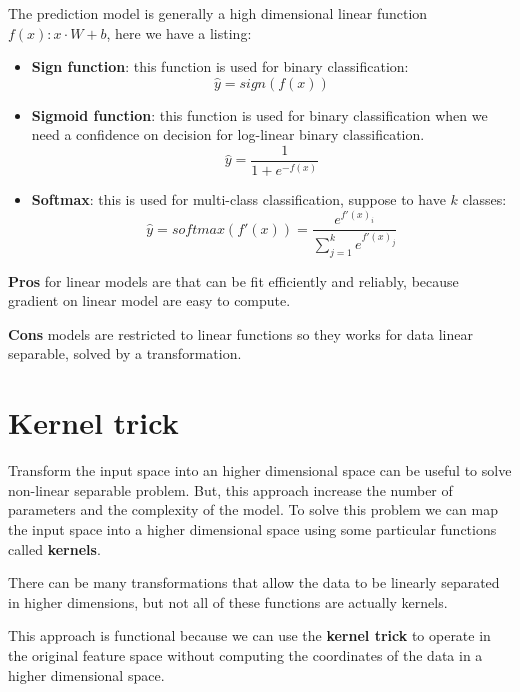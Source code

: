 The prediction model is generally a high dimensional linear function $f(x): x \cdot W + b$,
here we have a listing:
\begin{itemize}
    \item \textbf{Sign function}: this function is used for binary classification:
          \begin{equation}
              \hat{y} = sign(f(x))
          \end{equation}
    \item \textbf{Sigmoid function}: this function is used for binary classification
          when we need a confidence on decision for log-linear binary classification.
          \begin{equation}
              \hat{y} = \frac{1}{1+e^{-f(x)}}
          \end{equation}
    \item \textbf{Softmax}: this is used for multi-class classification, suppose
          to have $k$ classes:
          \begin{equation}
              \hat{y} = softmax(f'(x)) = \frac{e^{f'(x)_i}}{\sum_{j=1}^k e^{f'(x)_j}}
          \end{equation}
\end{itemize}

\textbf{Pros} for linear models are that can be fit efficiently and reliably, because
gradient on linear model are easy to compute.

\textbf{Cons} models are restricted to linear functions so they works for data linear
separable, solved by a transformation.

\section{Kernel trick}
Transform the input space into an higher dimensional space can be useful to solve
non-linear separable problem. But, this approach increase the number of parameters
and the complexity of the model. To solve this problem we can map the input space
into a higher dimensional space using some particular functions called \textbf{kernels}.

\begin{note}
    There can be many transformations that allow the data to be linearly separated
    in higher dimensions, but not all of these functions are actually kernels.
\end{note}

This approach is functional because we can use the \textbf{kernel trick} to operate
in the original feature space without computing the coordinates of the data in a
higher dimensional space.

